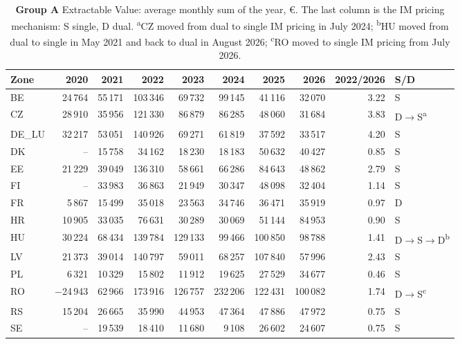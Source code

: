\documentclass[11pt,a4paper]{article}
\begin{document}
\begin{table}[htbp]
\centering
\small
\setlength{\tabcolsep}{4pt}
\begin{tabular}{@{}l rrrrrrr r l@{}}
\toprule
Zone & 2020 & 2021 & 2022 & 2023 & 2024 & 2025 & 2026 & 2022/2026 & S/D \\
\midrule
BE & 24\,764 & 55\,171 & 103\,346 & 69\,732 & 99\,145 & 41\,116 & 32\,070 & 3.22 & S \\
CZ & 28\,910 & 35\,956 & 121\,330 & 86\,879 & 86\,285 & 48\,060 & 31\,684 & 3.83 & D$\rightarrow$S\textsuperscript{a} \\
DE\_LU & 32\,217 & 53\,051 & 140\,926 & 69\,271 & 61\,819 & 37\,592 & 33\,517 & 4.20 & S \\
DK & -- & 15\,758 & 34\,162 & 18\,230 & 18\,183 & 50\,632 & 40\,427 & 0.85 & S \\
EE & 21\,229 & 39\,049 & 136\,310 & 58\,661 & 66\,286 & 84\,643 & 48\,862 & 2.79 & S \\
FI & -- & 33\,983 & 36\,863 & 21\,949 & 30\,347 & 48\,098 & 32\,404 & 1.14 & S \\
FR & 5\,867 & 15\,499 & 35\,018 & 23\,563 & 34\,746 & 36\,471 & 35\,919 & 0.97 & D \\
HR & 10\,905 & 33\,035 & 76\,631 & 30\,289 & 30\,069 & 51\,144 & 84\,953 & 0.90 & S \\
HU & 30\,224 & 68\,434 & 139\,784 & 129\,133 & 99\,466 & 100\,850 & 98\,788 & 1.41 & D$\rightarrow$S$\rightarrow$D\textsuperscript{b} \\
LV & 21\,373 & 39\,014 & 140\,797 & 59\,011 & 68\,257 & 107\,840 & 57\,996 & 2.43 & S \\
PL & 6\,321 & 10\,329 & 15\,802 & 11\,912 & 19\,625 & 27\,529 & 34\,677 & 0.46 & S \\
RO & $-$24\,943 & 62\,966 & 173\,916 & 126\,757 & 232\,206 & 122\,431 & 100\,082 & 1.74 & D$\rightarrow$S\textsuperscript{c} \\
RS & 15\,204 & 26\,665 & 35\,990 & 44\,953 & 47\,364 & 47\,886 & 47\,972 & 0.75 & S \\
SE & -- & 19\,539 & 18\,410 & 11\,680 & 9\,108 & 26\,602 & 24\,607 & 0.75 & S \\
\bottomrule
\end{tabular}
\caption{\textbf{Group A} Extractable Value: average monthly sum of the year, \euro. The last column is the IM pricing mechanism: S single, D dual. \newline \textsuperscript{a}CZ moved from dual to single IM pricing in July 2024; \textsuperscript{b}HU moved from dual to single in May 2021 and back to dual in August 2026; \textsuperscript{c}RO moved to single IM pricing from July 2026.}
\label{tab:ev_group_A}
\end{table}
\end{document}
